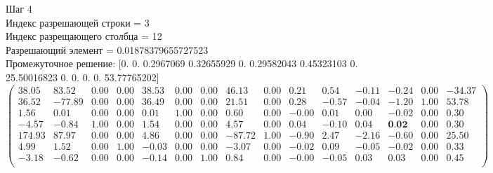 \documentclass[draft]{article}
\begin{document}
\begin{flushleft}
    Шаг 4 \\
    Индекс разрешающей строки = 3\\
    Индекс разрещающего столбца = 12\\
    Разрешающий элемент = 0.01878379655727523\\
    Промежуточное решение:
    [0.  0.  0.2967069  0.32655929  0.  0.29582043  0.45323103  0.  25.50016823  0.  0.  0.  0.  53.77765202]
\begin{equation*}
\begin{pmatrix}
    38.05 &  83.52 & 0.00 & 0.00 & 38.53 & 0.00 & 0.00 &  46.13 & 0.00 &  0.21 &  0.54 & -0.11 & -0.24 & 0.00 & -34.37 \\
    36.52 & -77.89 & 0.00 & 0.00 & 36.49 & 0.00 & 0.00 &  21.51 & 0.00 &  0.28 & -0.57 & -0.04 & -1.20 & 1.00 &  53.78 \\
    1.56 &   0.01 & 0.00 & 0.00 &  0.01 & 1.00 & 0.00 &   0.60 & 0.00 & -0.00 &  0.01 &  0.00 & -0.02 & 0.00 &   0.30 \\
    -4.57 &  -0.84 & 1.00 & 0.00 &  1.54 & 0.00 & 0.00 &   4.57 & 0.00 &  0.04 & -0.10 &  0.04 &  \textbf{0.02} & 0.00 &   0.30 \\
    174.93 &  87.97 & 0.00 & 0.00 &  4.86 & 0.00 & 0.00 & -87.72 & 1.00 & -0.90 &  2.47 & -2.16 & -0.60 & 0.00 &  25.50 \\
    4.99 &   1.52 & 0.00 & 1.00 & -0.03 & 0.00 & 0.00 &  -3.07 & 0.00 & -0.02 &  0.09 & -0.05 & -0.02 & 0.00 &   0.33 \\
    -3.18 &  -0.62 & 0.00 & 0.00 & -0.14 & 0.00 & 1.00 &   0.84 & 0.00 & -0.00 & -0.05 &  0.03 &  0.03 & 0.00 &   0.45 \\
\end{pmatrix}
\end{equation*}
\end{flushleft}
\end{document}
